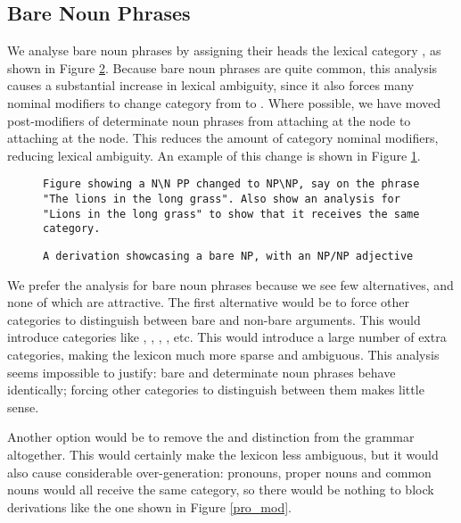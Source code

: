 \subsection{Bare Noun Phrases}

We analyse bare noun phrases by assigning their heads the lexical category , as shown in Figure \ref{nnp_ccg}. Because bare noun phrases are quite common, this analysis causes a substantial increase in lexical ambiguity, since it also forces many nominal modifiers to change category from  to . Where possible, we have moved post-modifiers of determinate noun phrases from attaching at the  node to attaching at the  node. This reduces the amount of  category nominal modifiers, reducing lexical ambiguity. An example of this change is shown in Figure \ref{npnp_change}.

\begin{figure}
\begin{verbatim}
Figure showing a N\N PP changed to NP\NP, say on the phrase "The lions in the long grass". Also show an analysis for "Lions in the long grass" to show that it receives the same category.
\end{verbatim}
\label{npnp_change}
\end{figure}

\begin{figure}
\begin{verbatim}
A derivation showcasing a bare NP, with an NP/NP adjective
\end{verbatim}
\label{nnp_ccg}
\end{figure}

We prefer the  analysis for bare noun phrases because we see few alternatives, and none of which are attractive. The first alternative would be to force other categories to distinguish between bare and non-bare  arguments. This would introduce categories like , , , , etc. This would introduce a large number of extra categories, making the lexicon much more sparse and ambiguous. This analysis seems impossible to justify: bare and determinate noun phrases behave identically; forcing other categories to distinguish between them makes little sense.

Another option would be to remove the  and  distinction from the grammar altogether. This would certainly make the lexicon less ambiguous, but it would also cause considerable over-generation: pronouns, proper nouns and common nouns would all receive the same category, so there would be nothing to block derivations like the one shown in Figure \ref{pro_mod}.

